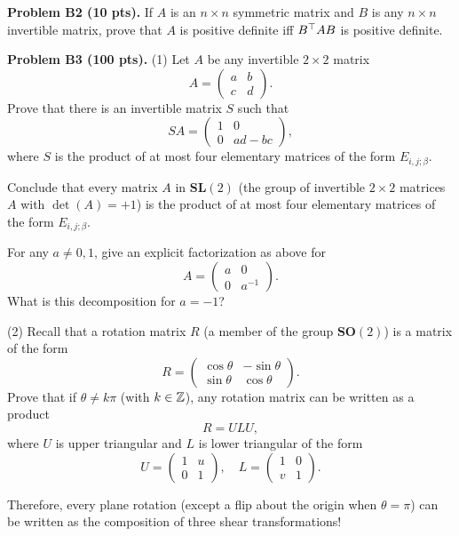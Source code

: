 \documentclass[12pt]{article}
\begin{document}
\vspace {0.25cm}\noindent
{\bf Problem B2 (10 pts).}
If $A$ is an $n\times n$ symmetric matrix and $B$ is any 
$n\times n$ invertible matrix, prove that $A$ is positive definite
iff $B^{\top} A B$ is positive definite.



\vspace {0.25cm}\noindent
{\bf Problem B3 (100 pts).}
(1)
Let $A$ be any invertible $2\times 2$ matrix
\[
A = 
\begin{pmatrix}
a & b \\
c & d
\end{pmatrix}.
\]
Prove that there is an invertible matrix $S$ such that
\[
SA = 
\begin{pmatrix}
1 & 0 \\
0 & ad - bc
\end{pmatrix},
\]
where $S$ is the product of at most four elementary matrices
of the form $E_{i, j; \beta}$.

\medskip
Conclude that every matrix $A$ in $\mathbf{SL}(2)$ 
(the group of invertible $2\times 2$ matrices $A$ with
$\det(A) = +1$)  is the product of
at most four elementary matrices
of the form $E_{i, j; \beta}$.

\medskip
For any $a\not= 0, 1$, give an explicit factorization as above for
\[
A = 
\begin{pmatrix}
a & 0 \\
0 & a^{-1}
\end{pmatrix}.
\]
What is this decomposition for $a = -1$?

\medskip
(2)
Recall that a rotation matrix $R$ (a member of the group
$\mathbf{SO}(2)$)  is a matrix of the form
\[
R = 
\begin{pmatrix}
\cos\theta & -\sin\theta \\
\sin\theta & \cos\theta
\end{pmatrix}.
\]
Prove that if $\theta \not= k \pi$ (with $k \in {\mathbb Z}$), 
any rotation matrix can be written as a product 
\[
R = U L U,
\] 
where $U$ is upper triangular and $L$ is lower triangular 
of the form
\[
U = 
\begin{pmatrix}
1 & u \\
0 & 1
\end{pmatrix},
\quad
L = 
\begin{pmatrix}
1 & 0 \\
v & 1
\end{pmatrix}.
\]

\medskip
Therefore, every plane rotation (except a flip about the origin when 
$\theta = \pi$) can be written as the composition of three
shear transformations!
\end{document}
